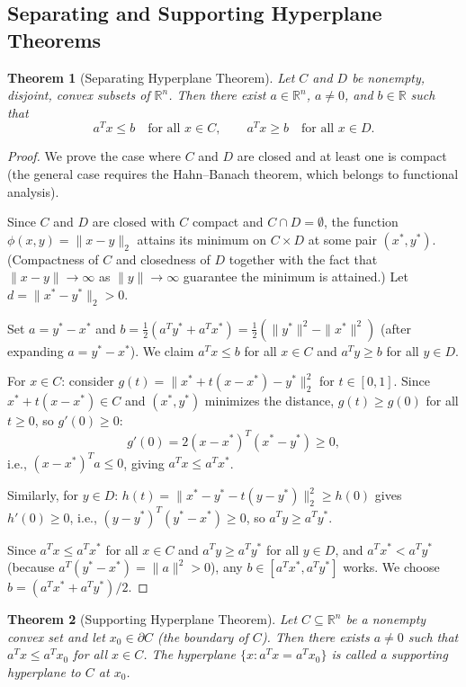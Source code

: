 \documentclass[11pt,a4paper]{article}
\newtheorem{theorem}{Theorem}[section]
\theoremstyle{definition}
\theoremstyle{remark}
\newcommand{\R}{\mathbb{R}}
\begin{document}
\subsection{Separating and Supporting Hyperplane Theorems}

\begin{theorem}[Separating Hyperplane Theorem]
\label{thm:separating}
Let $C$ and $D$ be nonempty, disjoint, convex subsets of $\R^n$. Then there exist
$a \in \R^n$, $a \ne 0$, and $b \in \R$ such that
\[
  a^T x \le b \quad \text{for all } x \in C, \qquad
  a^T x \ge b \quad \text{for all } x \in D.
\]
\end{theorem}

\begin{proof}
We prove the case where $C$ and $D$ are closed and at least one is compact (the general
case requires the Hahn--Banach theorem, which belongs to functional analysis).

Since $C$ and $D$ are closed with $C$ compact and $C \cap D = \emptyset$, the function
$\phi(x, y) = \|x - y\|_2$ attains its minimum on $C \times D$ at some pair
$(x^*, y^*)$. (Compactness of $C$ and closedness of $D$ together with the fact that
$\|x - y\| \to \infty$ as $\|y\| \to \infty$ guarantee the minimum is attained.) Let
$d = \|x^* - y^*\|_2 > 0$.

Set $a = y^* - x^*$ and $b = \tfrac{1}{2}(a^T y^* + a^T x^*) =
\tfrac{1}{2}(\|y^*\|^2 - \|x^*\|^2)$ (after expanding $a = y^* - x^*$). We claim
$a^T x \le b$ for all $x \in C$ and $a^T y \ge b$ for all $y \in D$.

For $x \in C$: consider $g(t) = \|x^* + t(x - x^*) - y^*\|_2^2$ for $t \in [0,1]$.
Since $x^* + t(x - x^*) \in C$ and $(x^*, y^*)$ minimizes the distance, $g(t) \ge
g(0)$ for all $t \ge 0$, so $g'(0) \ge 0$:
\[
  g'(0) = 2(x - x^*)^T(x^* - y^*) \ge 0,
\]
i.e., $(x - x^*)^T a \le 0$, giving $a^T x \le a^T x^*$.

Similarly, for $y \in D$: $h(t) = \|x^* - y^* - t(y - y^*)\|_2^2 \ge h(0)$
gives $h'(0) \ge 0$, i.e., $(y - y^*)^T(y^* - x^*) \ge 0$, so $a^T y \ge a^T y^*$.

Since $a^T x \le a^T x^*$ for all $x \in C$ and $a^T y \ge a^T y^*$ for all $y \in D$,
and $a^T x^* < a^T y^*$ (because $a^T(y^* - x^*) = \|a\|^2 > 0$), any
$b \in [a^T x^*, a^T y^*]$ works. We choose $b = (a^T x^* + a^T y^*)/2$.
\end{proof}

\begin{theorem}[Supporting Hyperplane Theorem]
\label{thm:supporting}
Let $C \subseteq \R^n$ be a nonempty convex set and let $x_0 \in \partial C$ (the
boundary of $C$). Then there exists $a \ne 0$ such that $a^T x \le a^T x_0$ for all
$x \in C$. The hyperplane $\{x : a^T x = a^T x_0\}$ is called a \emph{supporting
hyperplane} to $C$ at $x_0$.
\end{theorem}
\end{document}
